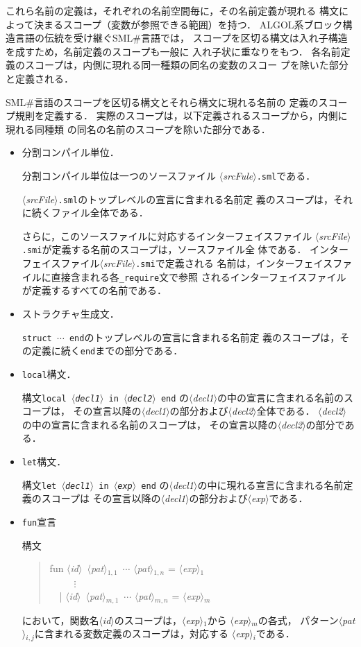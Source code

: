 \documentclass{jbook}
\newcommand{\smlsharp}{SML\#}
\newcommand{\code}[1]{\mbox{\large\tt #1}}
\newcommand{\nonterm}[1]{\mbox{$\langle$}{\it #1}\mbox{$\rangle$}}
\newenvironment{program}{\begin{quote}\begin{tt}}%
                        {\end{tt}\end{quote}}
\begin{document}
	これら名前の定義は，それぞれの名前空間毎に，その名前定義が現れる
構文によって決まるスコープ（変数が参照できる範囲）を持つ．
	ALGOL系ブロック構造言語の伝統を受け継ぐ\smlsharp{}言語では，
スコープを区切る構文は入れ子構造を成すため，名前定義のスコープも一般に
入れ子状に重なりをもつ．
	各名前定義のスコープは，内側に現れる同一種類の同名の変数のスコー
プを除いた部分と定義される．
	
	\smlsharp{}言語のスコープを区切る構文とそれら構文に現れる名前の
定義のスコープ規則を定義する．
	実際のスコープは，以下定義されるスコープから，内側に現れる同種類
の同名の名前のスコープを除いた部分である．
\begin{itemize}
\item 分割コンパイル単位．

	分割コンパイル単位は一つのソースファイル
\nonterm{srcFule}{\tt .sml}である．

	\nonterm{srcFile}{\tt .sml}のトップレベルの宣言に含まれる名前定
義のスコープは，それに続くファイル全体である．

	さらに，このソースファイルに対応するインターフェイスファイル
\nonterm{srcFile}{\tt .smi}が定義する名前のスコープは，ソースファイル全
体である．
	インターフェイスファイル\nonterm{srcFile}{\tt .smi}で定義される
名前は，インターフェイスファイルに直接含まれる各\code{\_require}文で参照
されるインターフェイスファイルが定義するすべての名前である．

\item ストラクチャ生成文．

	\code{struct $\cdots$ end}のトップレベルの宣言に含まれる名前定
義のスコープは，その定義に続く\code{end}までの部分である．

\item \code{local}構文．

	構文\code{local \nonterm{decl1} in \nonterm{decl2} end}
の\nonterm{decl1}の中の宣言に含まれる名前のスコープは，
その宣言以降の\nonterm{decl1}の部分および\nonterm{decl2}全体である．
	\nonterm{decl2}の中の宣言に含まれる名前のスコープは，
その宣言以降の\nonterm{decl2}の部分である．

\item \code{let}構文．

	構文\code{let \nonterm{decl1} in \nonterm{exp} end}
の\nonterm{decl1}の中に現れる宣言に含まれる名前定義のスコープは
その宣言以降の\nonterm{decl1}の部分および\nonterm{exp}である．

\item \code{fun}宣言

構文
\begin{program}
fun \nonterm{id}\ \nonterm{pat}$_{1,1}$\ $\cdots$ \nonterm{pat}$_{1,n}$ = \nonterm{exp}$_1$\\
\ \ \ \ \ $\vdots$\\
\ \ | \nonterm{id}\ \nonterm{pat}$_{m,1}$\ $\cdots$ \nonterm{pat}$_{m,n}$ = \nonterm{exp}$_m$
\end{program}
において，関数名\nonterm{id}のスコープは，\nonterm{exp}$_1$から
\nonterm{exp}$_m$の各式，
パターン\nonterm{pat}$_{i,j}$に含まれる変数定義のスコープは，対応する
\nonterm{exp}$_i$である．


\end{itemize}
\end{document}
